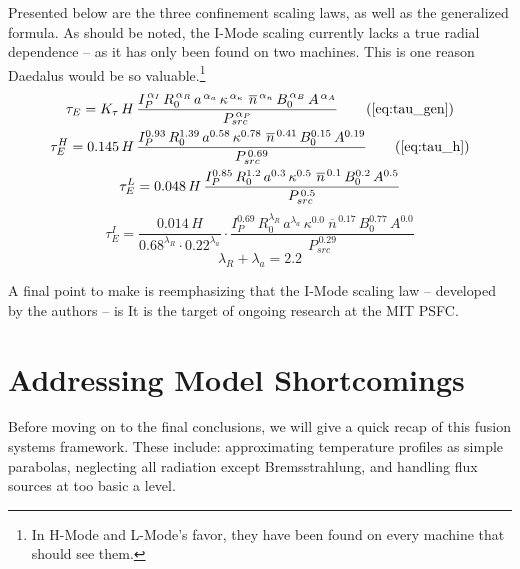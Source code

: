 Presented below are the three confinement scaling laws, as well as the generalized formula. As should be noted, the I-Mode scaling currently lacks a true radial dependence -- as it has only been found on two machines.\cite{imode} This is one reason Daedalus would be so valuable.\footnote{In H-Mode and L-Mode's favor, they have been found on every machine that should see them. } 
\begin{gather}
  \tau_E = K_\tau \, H \, \frac{
    I_P^{\,\alpha_I} \, R_0^{\,\alpha_R} \, a^{\,\alpha_a} \, \kappa^{\,\alpha_\kappa} \ \overline{n}^{\,\alpha_n} \, B_0^{\,\alpha_B} \, A^{\,\alpha_A}
  }{ P_{src} ^ {\,\alpha_P} }
  \tag{\ref{eq:tau_gen}} \\
  \tau_E^H = 0.145 \, H \, \frac{
    I_P^{0.93} \, R_0^{1.39} \, a^{0.58} \, \kappa^{0.78} \ \overline{n}^{\, 0.41} \, B_0^{0.15} \, A^{0.19}
  }{ P_{src} ^ {\,0.69} }
  \tag{\ref{eq:tau_h}} \\
  \tau_E^L = 0.048\, H \, \frac{
    I_P^{0.85} \, R_0^{1.2} \, a^{0.3} \, \kappa^{0.5} \ \overline{n}^{\, 0.1} \, B_0^{0.2} \, A^{0.5} }{ P_{src} ^ {\,0.5} }
\end{gather}
\begin{equation}
  \tau_E^I = \frac{ 0.014 \, H }{ 0.68 ^ {\lambda_R} \cdot 0.22 ^ {\lambda_a} } \cdot \frac{ I_P^{0.69} \, R_0^{\lambda_R} \, a^{\lambda_a} \, \kappa^{0.0} \ \overline{n}^{\, 0.17} \, B_0^{0.77} \, A^{0.0} }{ P_{src} ^ {\,0.29} }
\end{equation}
\begin{equation}
	\lambda_R + \lambda_a = 2.2
\end{equation}

A final point to make is reemphasizing that the I-Mode scaling law -- developed by the authors -- is  It is the target of ongoing research at the MIT PSFC.\cite{imode}

\section{Addressing Model Shortcomings}

Before moving on to the final conclusions, we will give a quick recap of  this fusion systems framework. These include: approximating temperature profiles as simple parabolas, neglecting all radiation except Bremsstrahlung, and handling flux sources at too basic a level. 

